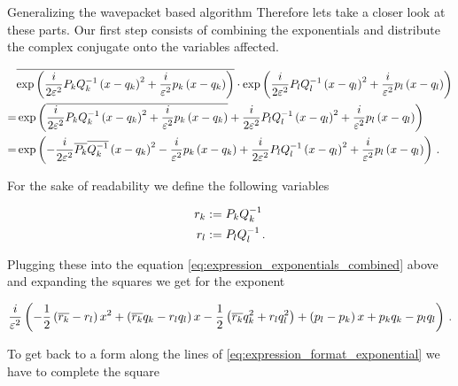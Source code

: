 \begin{chapter}{Generalizing the wavepacket based algorithm}
Therefore lets take a closer look at these parts. Our first step consists of combining the exponentials
and distribute the complex conjugate onto the variables affected.

\begin{align} \label{eq:expression_exponentials_combined}
  & \overline{\exp\left(\frac{i}{2\varepsilon^2} P_k Q_k^{-1} \left(x-q_k\right)^2 + \frac{i}{\varepsilon^2} p_k \left( x-q_k \right)\right)}
  \cdot \exp\left(\frac{i}{2\varepsilon^2} P_l Q_l^{-1} \left(x-q_l\right)^2 + \frac{i}{\varepsilon^2} p_l \left( x-q_l \right)\right) \nonumber \\
  = & \exp\left(\overline{\frac{i}{2\varepsilon^2} P_k Q_k^{-1} \left(x-q_k\right)^2 + \frac{i}{\varepsilon^2} p_k \left( x-q_k \right)}
              + \frac{i}{2\varepsilon^2} P_l Q_l^{-1} \left(x-q_l\right)^2 + \frac{i}{\varepsilon^2} p_l \left( x-q_l \right) \right) \nonumber \\
  = & \exp\left( -\frac{i}{2\varepsilon^2} \overline{P_k} \overline{Q_k^{-1}} \left(x-q_k\right)^2 - \frac{i}{\varepsilon^2} p_k \left( x-q_k \right)
              + \frac{i}{2\varepsilon^2} P_l Q_l^{-1} \left(x-q_l\right)^2 + \frac{i}{\varepsilon^2} p_l \left( x-q_l \right) \right) \,.
\end{align}

For the sake of readability we define the following variables

\begin{equation}
\begin{split}
  r_k & := P_k Q_k^{-1} \\
  r_l & := P_l Q_l^{-1} \,.
\end{split}
\end{equation}

Plugging these into the equation \eqref{eq:expression_exponentials_combined} above
and expanding the squares we get for the exponent

\begin{equation}
  \frac{i}{\varepsilon^2} \left( - \frac{1}{2}\left(\overline{r_k}-r_l\right) x^2
                                 + \left(\overline{r_k}q_k-r_l q_l\right) x
                                 - \frac{1}{2}\left(\overline{r_k}q_k^2 + r_l q_l^2\right)
                                 + \left(p_l-p_k\right) x
                                 + p_k q_k - p_l q_l
                          \right) \,.
\end{equation}

To get back to a form along the lines of \eqref{eq:expression_format_exponential} we
have to complete the square


\end{chapter}
